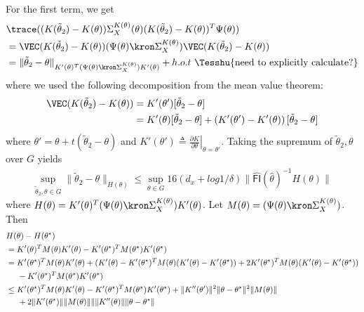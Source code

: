 \begin{enumerate}
For the first term, we get
\begin{align*}
    &\trace ((K(\tilde\theta_2)-K(\theta))\Sigma_X^{K(\theta)}(\theta)(K(\tilde\theta_2)-K(\theta))^T\Psi(\theta)) \\
    &= \VEC(K(\tilde\theta_2) - K(\theta))(\Psi(\theta)\kron\Sigma_X^{K(\theta)})\VEC(K(\tilde\theta_2)-K(\theta)) \\
    &= \|\tilde\theta_2-\theta\|_{K'(\theta)^T(\Psi(\theta)\kron\Sigma_X^{K(\theta)})K'(\theta)} + h.o.t ~\Tesshu{\text{need to explicitly calculate?}}
\end{align*}
where we used the following decomposition from the mean value theorem:
\begin{align*}
    \VEC(K(\tilde\theta_2)-K(\theta)) &= K'(\theta')[\tilde\theta_2 - \theta] \\
    &= K'(\theta)[\tilde\theta_2 - \theta] + \left(K'(\theta') - K'(\theta)\right)[\tilde\theta_2 - \theta]
\end{align*}
where $\theta' = \theta + t(\tilde\theta_2 - \theta)$ and $K'(\theta') \triangleq \left.\frac{\partial K}{\partial \theta}\right|_{\theta = \theta'}$. 
Taking the supremum of $\tilde\theta_2, \theta$ over $G$ yields
\begin{align*}
    \sup_{\tilde\theta_2, \theta\in G}\|\tilde\theta_2 - \theta\|_{H(\theta)} \leq \sup_{\theta\in G}16(d_x + log1/\delta)\|\mathsf{\hat{FI}}(\hat\theta)^{-1}H(\theta)\|
\end{align*}
where $H(\theta) = K'(\theta)^T(\Psi(\theta)\kron\Sigma_X^{K(\theta)})K'(\theta)$. 
Let $M(\theta) = (\Psi(\theta)\kron\Sigma_X^{K(\theta)})$. Then
\begin{align*}
    &H(\theta) - H(\theta^\star) \\
    &= K'(\theta)^TM(\theta)K'(\theta) - K'(\theta^\star)^TM(\theta^\star)K'(\theta^\star) \\
    &= K'(\theta^\star)^TM(\theta)K'(\theta) + (K'(\theta) - K'(\theta^\star)^TM(\theta)(K'(\theta) - K'(\theta^\star)) + 2K'(\theta^\star)^TM(\theta)(K'(\theta) - K'(\theta^\star)) \\
    &\hspace{5mm}- K'(\theta^\star)^TM(\theta^\star)K'(\theta^\star) \\
    &\leq K'(\theta^\star)^TM(\theta)K'(\theta) - K'(\theta^\star)^TM(\theta^\star)K'(\theta^\star)
    + \|K''(\theta')\|^2\|\theta-\theta^\star\|^2\|M(\theta)\| \\
    &\hspace{5mm}+ 2\|K'(\theta^\star)\|\|M(\theta)\|\|\|K''(\theta)\|\|\theta-\theta^\star\|\\

\end{align*}
\end{enumerate}
